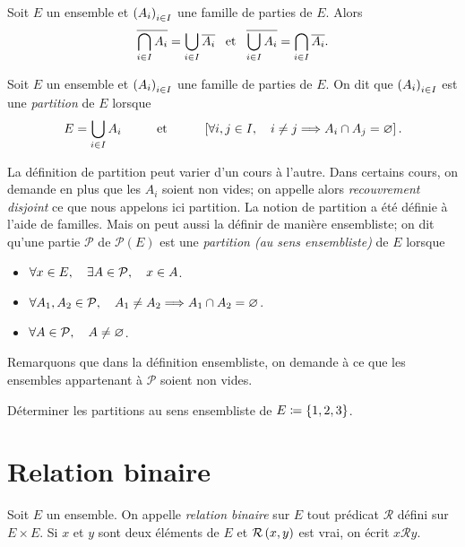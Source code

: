 \documentclass{magnoliaold}
\begin{document}
\begin{proposition}[utile=-3]
Soit $E$ un ensemble et $\left(A_i\right)_{i\in I}$ une famille de parties de $E$. Alors
\[\overline{\bigcap\limits_{i\in I} A_i}=\bigcup\limits_{i\in I} \overline{A_i} \quad\!\text{et}\quad\!
  \overline{\bigcup\limits_{i\in I} A_i}=\bigcap\limits_{i\in I} \overline{A_i}.\]
\end{proposition}

\begin{definition}[utile=-3, nom=Partition]
Soit $E$ un ensemble et $\left(A_i\right)_{i\in I}$ une famille de parties de $E$.
On dit que $\left(A_i\right)_{i\in I}$ est une \emph{partition} de $E$ lorsque
\[E = \bigcup_{i\in I} A_i \qquad\quad\!\text{et}\quad\!\qquad \left[\forall i,j\in I,\quad i\neq j\Longrightarrow
  A_i\cap A_j=\varnothing\right].\]
\end{definition}

\begin{remarques}
\remarque La définition de partition peut varier d'un cours à l'autre.
  Dans certains cours, on demande en plus que les $A_i$ soient non vides; on appelle
  alors \emph{recouvrement disjoint} ce que nous appelons ici partition.
\remarque La notion de partition a été définie à l'aide de familles. Mais on peut aussi
  la définir de manière ensembliste; on dit qu'une partie $\mathcal{P}$ de
  $\mathcal{P}(E)$ est une \emph{partition (au sens ensembliste)} de $E$ lorsque  
  \begin{itemize}
  \item $\forall x\in E,\quad \exists A\in\mathcal{P},\quad x\in A$.
  \item $\forall A_1, A_2\in\mathcal{P},\quad A_1\neq A_2\Longrightarrow A_1\cap A_2=\varnothing$.
  \item $\forall A\in\mathcal{P},\quad A\neq\varnothing$. 
  \end{itemize}
  Remarquons que dans la définition ensembliste, on demande à ce que les ensembles appartenant à $\mathcal{P}$
  soient non vides.
\end{remarques}

\begin{exoUnique}
\exo Déterminer les partitions au sens ensembliste de $E\coloneqq\left\{1,2,3\right\}$.
\end{exoUnique}

\section{Relation binaire}

\begin{definition}[utile=-3]
Soit $E$ un ensemble. On appelle \emph{relation binaire} sur $E$ tout prédicat
$\mathcal{R}$ défini sur $E\times E$. Si $x$ et $y$ sont deux
éléments de $E$ et $\mathcal{R}\left(x,y\right)$ est vrai, on écrit $x\mathcal{R} y$.
\end{definition}
\end{document}
